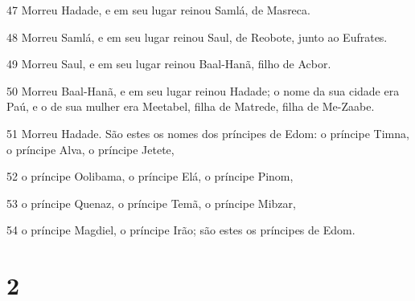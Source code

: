\par 47 Morreu Hadade, e em seu lugar reinou Samlá, de Masreca.
\par 48 Morreu Samlá, e em seu lugar reinou Saul, de Reobote, junto ao Eufrates.
\par 49 Morreu Saul, e em seu lugar reinou Baal-Hanã, filho de Acbor.
\par 50 Morreu Baal-Hanã, e em seu lugar reinou Hadade; o nome da sua cidade era Paú, e o de sua mulher era Meetabel, filha de Matrede, filha de Me-Zaabe.
\par 51 Morreu Hadade. São estes os nomes dos príncipes de Edom: o príncipe Timna, o príncipe Alva, o príncipe Jetete,
\par 52 o príncipe Oolibama, o príncipe Elá, o príncipe Pinom,
\par 53 o príncipe Quenaz, o príncipe Temã, o príncipe Mibzar,
\par 54 o príncipe Magdiel, o príncipe Irão; são estes os príncipes de Edom.

\chapter{2}

